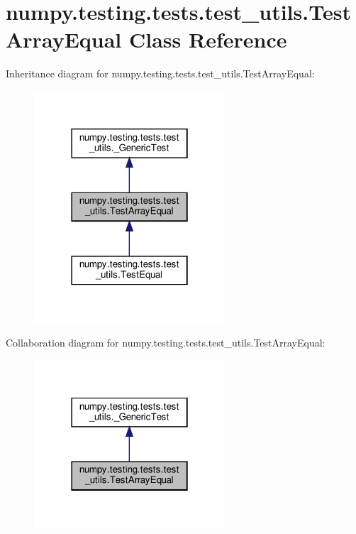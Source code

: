 \hypertarget{classnumpy_1_1testing_1_1tests_1_1test__utils_1_1TestArrayEqual}{}\section{numpy.\+testing.\+tests.\+test\+\_\+utils.\+Test\+Array\+Equal Class Reference}
\label{classnumpy_1_1testing_1_1tests_1_1test__utils_1_1TestArrayEqual}


Inheritance diagram for numpy.\+testing.\+tests.\+test\+\_\+utils.\+Test\+Array\+Equal\+:
\nopagebreak
\begin{figure}[H]
\begin{center}
\leavevmode
\includegraphics[width=202pt]{classnumpy_1_1testing_1_1tests_1_1test__utils_1_1TestArrayEqual__inherit__graph}
\end{center}
\end{figure}


Collaboration diagram for numpy.\+testing.\+tests.\+test\+\_\+utils.\+Test\+Array\+Equal\+:
\nopagebreak
\begin{figure}[H]
\begin{center}
\leavevmode
\includegraphics[width=202pt]{classnumpy_1_1testing_1_1tests_1_1test__utils_1_1TestArrayEqual__coll__graph}
\end{center}
\end{figure}
